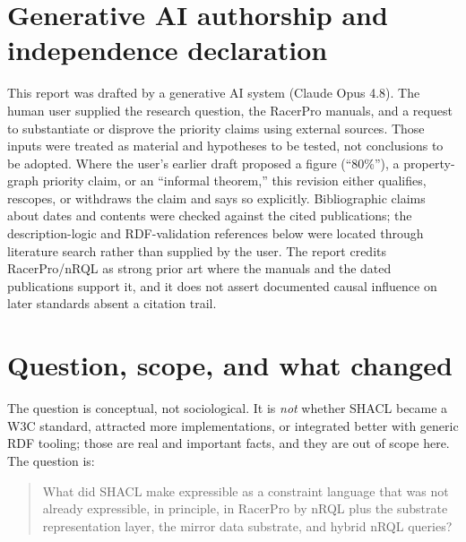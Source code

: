 \documentclass[11pt,letterpaper]{article}
\theoremstyle{definition}
\newcommand{\nrql}{nRQL}
\newcommand{\racer}{RacerPro}
\newcommand{\shacl}{SHACL}
\newcommand{\rdf}{RDF}
\begin{document}
\section*{Generative AI authorship and independence declaration}\label{sec:ai-declaration}
This report was drafted by a generative AI system (Claude Opus 4.8). The human user supplied the research question, the RacerPro manuals, and a request to substantiate or disprove the priority claims using external sources. Those inputs were treated as material and hypotheses to be tested, not conclusions to be adopted. Where the user's earlier draft proposed a figure (``80\%''), a property-graph priority claim, or an ``informal theorem,'' this revision either qualifies, rescopes, or withdraws the claim and says so explicitly. Bibliographic claims about dates and contents were checked against the cited publications; the description-logic and \rdf{}-validation references below were located through literature search rather than supplied by the user. The report credits \racer{}/\nrql{} as strong prior art where the manuals and the dated publications support it, and it does not assert documented causal influence on later standards absent a citation trail.

\tableofcontents
\newpage
{}

\section{Question, scope, and what changed}\label{sec:scope}

The question is conceptual, not sociological. It is \emph{not} whether \shacl{} became a W3C standard, attracted more implementations, or integrated better with generic \rdf{} tooling; those are real and important facts, and they are out of scope here. The question is:

\begin{quote}
What did \shacl{} make expressible as a constraint language that was not already expressible, in principle, in \racer{} by \nrql{} plus the substrate representation layer, the mirror data substrate, and hybrid \nrql{} queries?
\end{quote}
\end{document}
